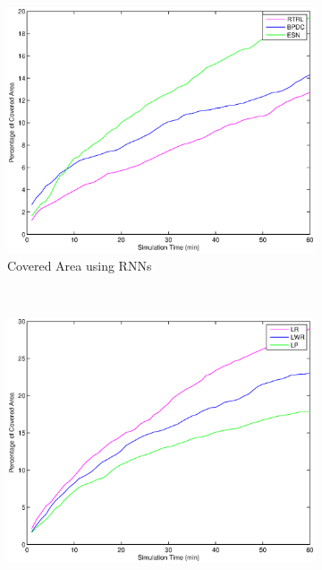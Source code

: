 \documentclass[msc,ai,logo]{infthesis}
\begin{document}
 
\begin{figure}[H]
        \centering
        \label{fig:00_AREA}
        \begin{subfigure}[b]{0.49\textwidth}
                \centering
                \includegraphics[width=\textwidth]{RNN_00_AREA.eps}
                \caption{Covered Area using RNNs}
              \label{fig:RNN_00_AREA}  
        \end{subfigure}%
        ~ %
        \begin{subfigure}[b]{0.49\textwidth}
                \centering
                \includegraphics[width=\textwidth]{LR_00_AREA.eps}

\end{subfigure}
\end{figure}
\end{document}
